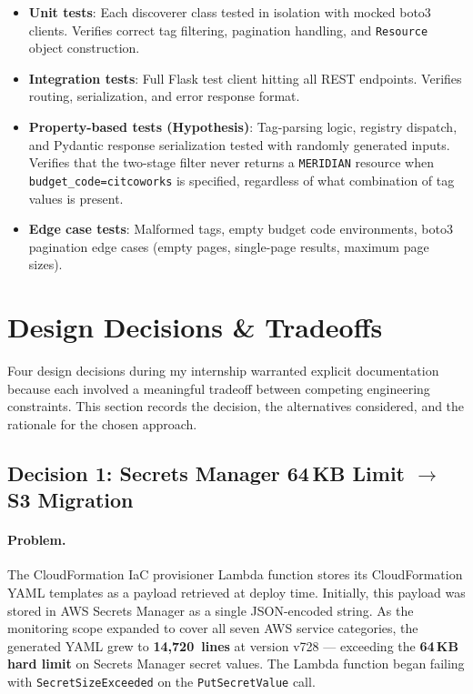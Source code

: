 \begin{itemize}
    \item \textbf{Unit tests}: Each discoverer class tested in isolation
          with mocked boto3 clients. Verifies correct tag filtering,
          pagination handling, and \texttt{Resource} object construction.

    \item \textbf{Integration tests}: Full Flask test client hitting
          all REST endpoints. Verifies routing, serialization, and
          error response format.

    \item \textbf{Property-based tests (Hypothesis)}: Tag-parsing logic,
          registry dispatch, and Pydantic response serialization tested
          with randomly generated inputs. Verifies that the two-stage
          filter never returns a \texttt{MERIDIAN} resource when
          \texttt{budget\_code=citcoworks} is specified, regardless of
          what combination of tag values is present.

    \item \textbf{Edge case tests}: Malformed tags, empty budget code
          environments, boto3 pagination edge cases (empty pages,
          single-page results, maximum page sizes).
\end{itemize}

\section{Design Decisions \& Tradeoffs}
\label{sec:design_decisions}

Four design decisions during my internship warranted explicit
documentation because each involved a meaningful tradeoff between
competing engineering constraints. This section records the decision,
the alternatives considered, and the rationale for the chosen approach.

\subsection{Decision 1: Secrets Manager 64\,KB Limit \texorpdfstring{$\to$}{→} S3 Migration}
\label{sec:decision_secrets_s3}

\paragraph{Problem.}
The CloudFormation IaC provisioner Lambda function stores its
CloudFormation YAML templates as a payload retrieved at deploy time.
Initially, this payload was stored in AWS Secrets Manager as a single
JSON-encoded string. As the monitoring scope expanded to cover all seven
AWS service categories, the generated YAML grew to \textbf{14,720~lines}
at version v728 --- exceeding the \textbf{64\,KB hard limit} on
Secrets Manager secret values. The Lambda function began failing with
\texttt{SecretSizeExceeded} on the \texttt{PutSecretValue} call.

